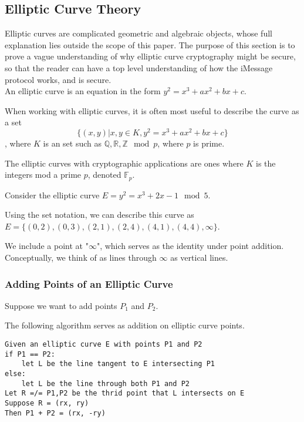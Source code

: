 \subsection{Elliptic Curve Theory}

Elliptic curves are complicated geometric and algebraic objects,
whose full explanation lies outside the scope of this paper.
The purpose of this section is to prove a vague understanding
of why elliptic curve cryptography might be secure, so that the reader
can have a top level understanding of how the iMessage protocol
works, and is secure.\\

An elliptic curve is an equation in the form $y^2 = x^3 + ax^2 + bx + c$.

When working with elliptic curves, it is often most useful to describe the curve as a set
$$\{(x,y) \vert x,y \in K, y^2 = x^3 + ax^2 + bx + c\}$$, where $K$ is an set such as
$\mathbb{Q}, \mathbb{R}, \mathbb{Z} \mod p$, where $p$ is prime.

The elliptic curves with cryptographic applications are ones where $K$ is the integers
mod a prime $p$, denoted $\mathbb{F}_p$.

\begin{example}
Consider the elliptic curve $E = y^2 = x^3+2x-1 \mod 5$.

Using the set notation, we can describe this curve as
$E = \{(0 ,2 ),(0,3),(2,1),(2 ,4 ),(4,1),(4,4), \infty\}$.
\end{example}

We include a point at
"$\infty$", which serves as the identity under point addition.
Conceptually, we think of as lines through $\infty$
as vertical lines.




\subsubsection{Adding Points of an Elliptic Curve}
Suppose we want to add points $P_1$ and $P_2$.

The following algorithm serves as addition on elliptic curve points.
\begin{center}
\begin{verbatim}
Given an elliptic curve E with points P1 and P2
if P1 == P2:
    let L be the line tangent to E intersecting P1
else:
    let L be the line through both P1 and P2
Let R =/= P1,P2 be the thrid point that L intersects on E
Suppose R = (rx, ry)
Then P1 + P2 = (rx, -ry)
\end{verbatim}
\end{center}

